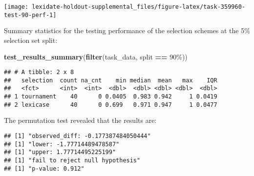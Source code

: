 \documentclass[
]{book}
\newenvironment{Shaded}{\begin{snugshade}}{\end{snugshade}}
\newcommand{\AttributeTok}[1]{\textcolor[rgb]{0.13,0.29,0.53}{#1}}
\newcommand{\DecValTok}[1]{\textcolor[rgb]{0.00,0.00,0.81}{#1}}
\newcommand{\FunctionTok}[1]{\textcolor[rgb]{0.13,0.29,0.53}{\textbf{#1}}}
\newcommand{\NormalTok}[1]{#1}
\newcommand{\OtherTok}[1]{\textcolor[rgb]{0.56,0.35,0.01}{#1}}
\newcommand{\SpecialCharTok}[1]{\textcolor[rgb]{0.81,0.36,0.00}{\textbf{#1}}}
\newcommand{\StringTok}[1]{\textcolor[rgb]{0.31,0.60,0.02}{#1}}
\begin{document}
\texttt{[image: lexidate-holdout-supplemental\_files/figure-latex/task-359960-test-90-perf-1]}

Summary statistics for the testing performance of the selection schemes at the 5\% selection set split:

\begin{Shaded}
\begin{Highlighting}[]
\FunctionTok{test\_results\_summary}\NormalTok{(}\FunctionTok{filter}\NormalTok{(task\_data, split }\SpecialCharTok{==} \StringTok{\textquotesingle{}90\%\textquotesingle{}}\NormalTok{))}
\end{Highlighting}
\end{Shaded}

\begin{verbatim}
## # A tibble: 2 x 8
##   selection  count na_cnt    min median  mean   max    IQR
##   <fct>      <int>  <int>  <dbl>  <dbl> <dbl> <dbl>  <dbl>
## 1 tournament    40      0 0.0405  0.983 0.942     1 0.0419
## 2 lexicase      40      0 0.699   0.971 0.947     1 0.0477
\end{verbatim}

The permutation test revealed that the results are:

\begin{Shaded}
\end{Shaded}

\begin{verbatim}
## [1] "observed_diff: -0.177387484050444"
## [1] "lower: -1.77714489478587"
## [1] "upper: 1.77714495225199"
## [1] "fail to reject null hypothesis"
## [1] "p-value: 0.912"
\end{verbatim}
\end{document}
